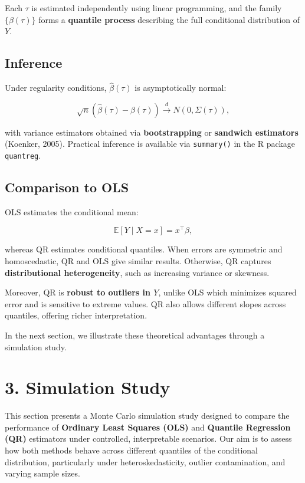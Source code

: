 \documentclass[fleqn,8pt]{latex/stylish_article} %
\begin{document}
Each \(\tau\) is estimated independently using linear programming, and the family \(\{\beta(\tau)\}\) forms a \textbf{quantile process} describing the full conditional distribution of \(Y\).

\subsection{Inference}\label{inference}

Under regularity conditions, \(\hat\beta(\tau)\) is asymptotically normal:

\[
\sqrt{n}(\hat\beta(\tau) - \beta(\tau)) \overset{d}{\to} N(0, \Sigma(\tau)),
\]

with variance estimators obtained via \textbf{bootstrapping} or \textbf{sandwich estimators} (Koenker, 2005). Practical inference is available via \texttt{summary()} in the R package \texttt{quantreg}.

\subsection{Comparison to OLS}\label{comparison-to-ols}

OLS estimates the conditional mean:

\[
\mathbb{E}[Y \mid X = x] = x^\top \beta,
\]

whereas QR estimates conditional quantiles. When errors are symmetric and homoscedastic, QR and OLS give similar results. Otherwise, QR captures \textbf{distributional heterogeneity}, such as increasing variance or skewness.

Moreover, QR is \textbf{robust to outliers in \(Y\)}, unlike OLS which minimizes squared error and is sensitive to extreme values. QR also allows different slopes across quantiles, offering richer interpretation.

In the next section, we illustrate these theoretical advantages through a simulation study.

\section{3. Simulation Study}\label{simulation-study}

This section presents a Monte Carlo simulation study designed to compare the performance of \textbf{Ordinary Least Squares (OLS)} and \textbf{Quantile Regression (QR)} estimators under controlled, interpretable scenarios. Our aim is to assess how both methods behave across different quantiles of the conditional distribution, particularly under heteroskedasticity, outlier contamination, and varying sample sizes.
\end{document}
